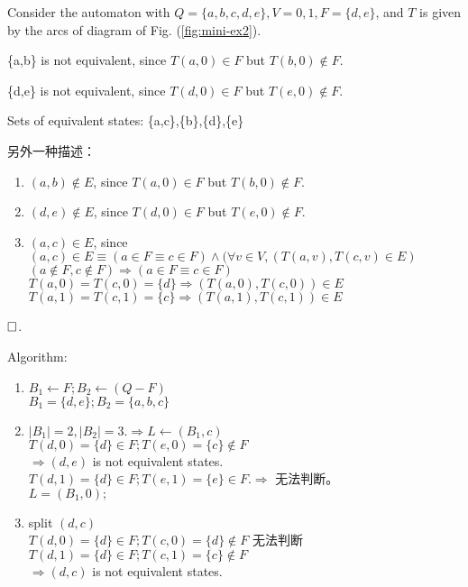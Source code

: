 \begin{example}
	Consider the automaton with $Q=\{a,b,c,d,e\},V={0,1},F=\{d,e\}$, and $T$ is given by the arcs of diagram of Fig. (\ref{fig:mini-ex2}).
	
	\{a,b\} is not equivalent, since $T(a,0)\in F$ but $T(b,0)\notin F$.
	
	\{d,e\} is not equivalent, since $T(d,0)\in F$ but $T(e,0)\notin F$. 
	
	Sets of equivalent states: \{a,c\},\{b\},\{d\},\{e\}
	
	另外一种描述：
	\begin{enumerate}
		\item $(a,b)\notin E$, since $T(a,0)\in F$ but $T(b,0)\notin F$.
		\item $(d,e)\notin E$, since $T(d,0)\in F$ but $T(e,0)\notin F$.
		\item 	$(a,c)\in E$, since	$(a,c)\in E\equiv(a\in F\equiv c\in F)\land (\forall v\in V,(T(a,v),T(c,v)\in E)$ \\
		$(a\notin F,c\notin F)\Rightarrow (a\in F\equiv c\in F)$ \\
		$T(a,0)=T(c,0)=\{d\}\Rightarrow (T(a,0),T(c,0)) \in E$\\
		$T(a,1)=T(c,1)=\{c\}\Rightarrow (T(a,1),T(c,1)) \in E$
	\end{enumerate}

	$\hfill\square$.

	Algorithm:
	\begin{enumerate}
		\item $B_1\leftarrow F; B_2\leftarrow (Q-F)$\\
			  $B_1=\{d,e\}; B_2=\{a,b,c\} $
	    \item $|B_1|=2,|B_2|=3.\Rightarrow L\leftarrow (B_1,c)$ \\
	    $T(d,0) =\{d\}\in F;T(e,0)=\{c\}\notin F$ \\ 
	    $\Rightarrow (d,e)$ is not equivalent states.\\
	    $T(d,1)=\{d\}\in F; T(e,1)=\{e\}\in F. \Rightarrow$ 无法判断。\\
	    $L=(B_1,0);$
	    \item split $(d,c)$ \\
	    $T(d,0)=\{d\}\in F; T(c,0)=\{d\}\notin F$ 无法判断\\
	    $T(d,1)=\{d\}\in F; T(c,1)=\{c\} \notin F$\\
	    $\Rightarrow (d,c)$ is not equivalent states.
	\end{enumerate}
\end{example}

